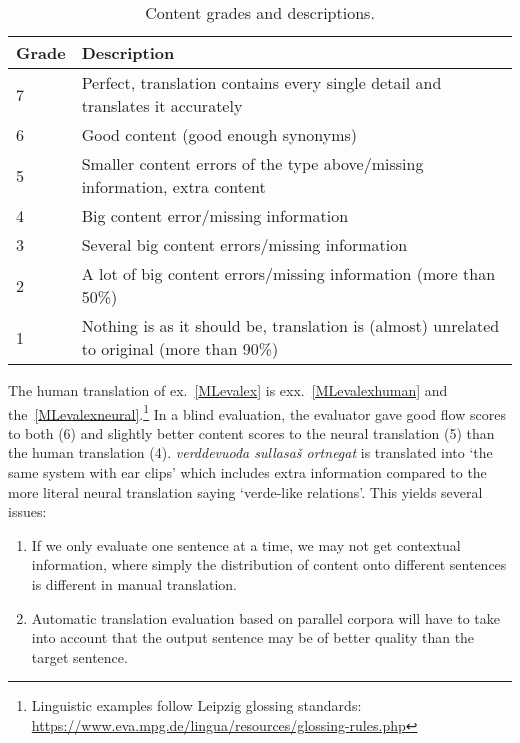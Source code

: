 \documentclass{flammie}
\begin{document}
\begin{table}[h]
\begin{center}
\small
\begin{tabular}{lp{6cm}}
\toprule
    \bf Grade & \bf Description \\
    \midrule
7 & Perfect, translation contains every single detail and translates it accurately \\
6 & Good content (good enough synonyms) \\
5 & Smaller content errors of the type above/missing information, extra content \\
4 & Big content error/missing information \\
3 & Several big content errors/missing information\\
    2 & A lot of big content errors/missing information (more than 50\%) \\
1 & Nothing is as it should be, translation is (almost) unrelated to original
    (more than 90\%) \\
\bottomrule
\end{tabular}
\end{center}
\caption{\label{content-table} Content grades and descriptions.}
\end{table}


The human translation of ex.~\ref{MLevalex} is exx.~\ref{MLevalexhuman} and
the~\ref{MLevalexneural}.\footnote{Linguistic examples follow Leipzig glossing
standards: \url{https://www.eva.mpg.de/lingua/resources/glossing-rules.php}} In
a blind evaluation, the evaluator gave good flow scores to both (6) and slightly
better content scores to the neural translation (5) than the human translation
(4). \textit{verddevuođa sullasaš ortnegat} is translated into `the same system
with ear clips' which includes extra information compared to the more literal
neural translation saying `verde-like relations'.  This yields several issues:

\begin{enumerate}
    \item If we only evaluate  one sentence at a time, we may not get contextual
        information, where simply the distribution of content onto different
        sentences is different in manual translation.
    \item Automatic translation evaluation based on parallel corpora will have
        to take into account that the output sentence may be of better quality
        than the target sentence.
\end{enumerate}
\end{document}
